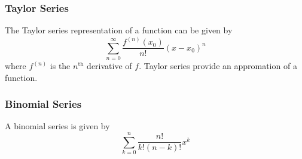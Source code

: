 \documentclass{article}
\begin{document}
\subsubsection{Taylor Series}
The Taylor series representation of a function can be given by
\[
\sum_{n=0}^{\infty}\frac{f^{(n)}(x_{0})}{n!}(x-x_{0})^{n}
\]
where $f^{(n)}$ is the $n^{\text{th}}$ derivative of $f$.
Taylor series provide an appromation of a function.

\subsubsection{Binomial Series}
A binomial series is given by
\[
\sum_{k=0}^{n}\frac{n!}{k!(n-k)!}x^{k}
\]
\end{document}
